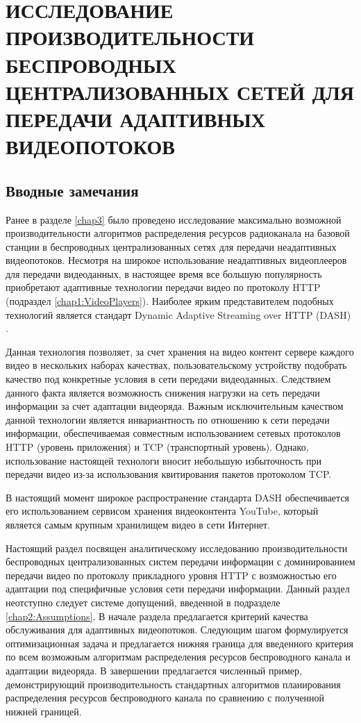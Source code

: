 \chapter{ИССЛЕДОВАНИЕ ПРОИЗВОДИТЕЛЬНОСТИ БЕСПРОВОДНЫХ ЦЕНТРАЛИЗОВАННЫХ СЕТЕЙ ДЛЯ ПЕРЕДАЧИ АДАПТИВНЫХ ВИДЕОПОТОКОВ}
\label{chap4}

\section{Вводные замечания}
\label{chap4:Intro}

Ранее в разделе \ref{chap3} было проведено исследование максимально возможной производительности алгоритмов распределения ресурсов радиоканала на базовой станции в беспроводных централизованных сетях для передачи неадаптивных видеопотоков. Несмотря на широкое использование неадаптивных видеоплееров для передачи видеоданных, в настоящее время все большую популярность приобретают адаптивные технологии передачи видео по протоколу HTTP (подраздел \ref{chap1:VideoPlayers}). Наиболее ярким представителем подобных технологий является стандарт Dynamic Adaptive Streaming over HTTP (DASH) \cite{dash_standard,conviva}.

Данная технология позволяет, за счет хранения на видео контент сервере каждого видео в нескольких наборах качествах, пользовательскому устройству подобрать качество под конкретные условия в сети передачи видеоданных. Следствием данного факта является возможность снижения нагрузки на сеть передачи информации за счет адаптации видеоряда. Важным исключительным качеством данной технологии является инвариантность по отношению к сети передачи информации, обеспечиваемая совместным использованием сетевых протоколов HTTP (уровень приложения) и TCP (транспортный уровень). Однако, использование настоящей технологи вносит небольшую избыточность при передачи видео из-за использования квитирования пакетов протоколом TCP.

В настоящий момент широкое распространение стандарта DASH обеспечивается его использованием сервисом хранения видеоконтента YouTube, который является самым крупным хранилищем видео в сети Интернет.

Настоящий раздел посвящен аналитическому исследованию производительности беспроводных централизованных систем передачи информации с доминированием передачи видео по протоколу прикладного уровня HTTP с возможностью его адаптации под специфичные условия сети передачи информации. Данный раздел неотступно следует системе допущений, введенной в подразделе \ref{chap2:Assumptions}. В начале раздела предлагается критерий качества обслуживания для адаптивных видеопотоков. Следующим шагом формулируется оптимизационная задача и предлагается нижняя граница для введенного критерия по всем возможным алгоритмам распределения ресурсов беспроводного канала и адаптации видеоряда. В завершении предлагается численный пример, демонстрирующий производительность стандартных алгоритмов планирования распределения ресурсов беспроводного канала по сравнению с полученной нижней границей.

